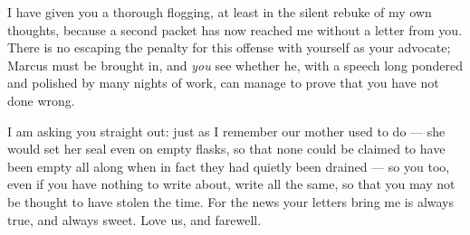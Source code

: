 

 I have given you a thorough flogging, at least in the silent rebuke of my own thoughts, because a second packet has now reached me without a letter from you. There is no escaping the penalty for this offense with yourself as your advocate; Marcus must be brought in, and \textit{you} see whether he, with a speech long pondered and polished by many nights of work, can manage to prove that you have not done wrong.

 I am asking you straight out: just as I remember our mother used to do --- she would set her seal even on empty flasks, so that none could be claimed to have been empty all along when in fact they had quietly been drained --- so you too, even if you have nothing to write about, write all the same, so that you may not be thought to have stolen the time. For the news your letters bring me is always true, and always sweet. Love us, and farewell.
